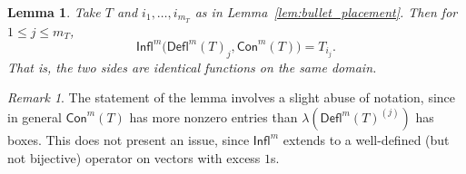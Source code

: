\documentclass[12pt]{amsart}
\newtheorem{lemma}[theorem]{Lemma}
\theoremstyle{definition}
\theoremstyle{remark}
\newtheorem{remark}[theorem]{Remark}
\numberwithin{equation}{section}
\newcommand{\deflate}{\ensuremath{\mathsf{Defl}}}
\newcommand{\tinflate}{\ensuremath{\mathsf{Infl}}}
\newcommand{\content}{\ensuremath{\mathsf{Con}}}
\begin{document}
\begin{lemma} \label{lem:gappy_promotion}
Take $T$ and $i_1, \ldots, i_{m_T}$ as in Lemma~\ref{lem:bullet_placement}. Then for $1 \leq j \leq m_T$, 
\begin{equation}\label{eq:gappy_promotion}
 \tinflate^m \Big( \deflate^m(T)_j, \content^m(T) \Big) = T_{i_j}.
\end{equation}
That is, the two sides are identical functions on the same domain. 
\end{lemma}
\begin{remark}The statement of the lemma involves a slight abuse of notation, since in general $\content^m(T)$ has more nonzero entries than $\lambda(\deflate^m(T)^{(j)})$ has boxes. This does not present an issue, since $\tinflate^m$ extends to a well-defined (but not bijective) operator on vectors with excess $1$s.
\end{remark}
\end{document}
